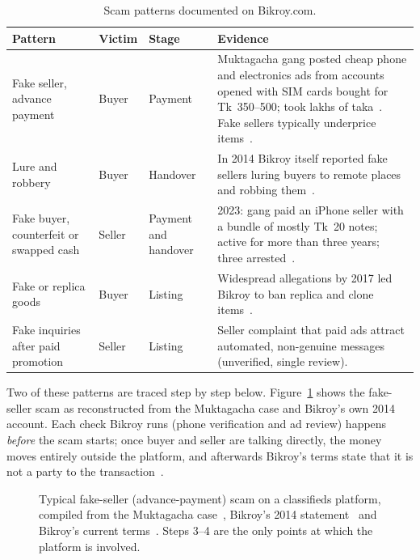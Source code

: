 \begin{table}[H]
  \centering
  \small
  \caption{Scam patterns documented on Bikroy.com.}
  \label{tab:scams}
  \begin{tabularx}{\textwidth}{@{}>{\raggedright\arraybackslash}p{2.7cm} >{\raggedright\arraybackslash}p{1.3cm} >{\raggedright\arraybackslash}p{1.9cm} Y@{}}
    \toprule
    \textbf{Pattern} & \textbf{Victim} & \textbf{Stage} & \textbf{Evidence} \\
    \midrule
    Fake seller, advance payment & Buyer & Payment
      & Muktagacha gang posted cheap phone and electronics ads from accounts opened with
        SIM cards bought for Tk~350--500; took lakhs of taka~\cite{ds_muktagacha}.
        Fake sellers typically underprice items~\cite{dt_2014}. \\
    Lure and robbery & Buyer & Handover
      & In 2014 Bikroy itself reported fake sellers luring buyers to remote places and
        robbing them~\cite{dt_2014}. \\
    Fake buyer, counterfeit or swapped cash & Seller & Payment and handover
      & 2023: gang paid an iPhone seller with a bundle of mostly Tk~20 notes; active for
        more than three years; three arrested~\cite{pa_2023}. \\
    Fake or replica goods & Buyer & Listing
      & Widespread allegations by 2017 led Bikroy to ban replica and clone
        items~\cite{fs_fraud}. \\
    Fake inquiries after paid promotion & Seller & Listing
      & Seller complaint that paid ads attract automated, non-genuine
        messages~\cite{trustpilot} (unverified, single review). \\
    \bottomrule
  \end{tabularx}
\end{table}

Two of these patterns are traced step by step below. Figure~\ref{fig:advance} shows the
fake-seller scam as reconstructed from the Muktagacha case and Bikroy's own 2014 account.
Each check Bikroy runs (phone verification and ad review) happens \emph{before} the scam
starts; once buyer and seller are talking directly, the money moves entirely outside the
platform, and afterwards Bikroy's terms state that it is not a party to the
transaction~\cite{bikroy_terms}.

\begin{figure}[H]
  \centering
  \resizebox{0.97\textwidth}{!}{}
  \caption{Typical fake-seller (advance-payment) scam on a classifieds platform, compiled
  from the Muktagacha case~\cite{ds_muktagacha}, Bikroy's 2014 statement~\cite{dt_2014} and
  Bikroy's current terms~\cite{bikroy_terms}. Steps 3--4 are the only points at which the
  platform is involved.}
  \label{fig:advance}
\end{figure}

